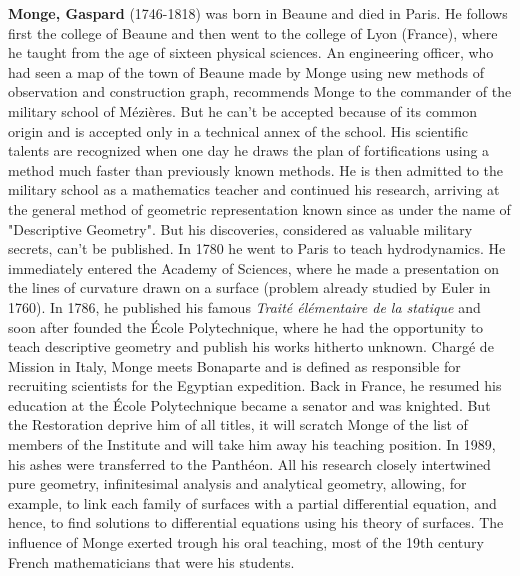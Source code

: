 \textbf{Monge, Gaspard} (1746-1818) was born in Beaune and died in Paris. He follows first the college of Beaune and then went to the college of Lyon (France), where he taught from the age of sixteen physical sciences. An engineering officer, who had seen a map of the town of Beaune made by Monge using new methods of observation and construction graph, recommends Monge to the commander of the military school of Mézières. But he can't be accepted because of its common origin and is accepted only in a technical annex of the school. His scientific talents are recognized when one day he draws the plan of fortifications using a method much faster than previously known methods. He is then admitted to the military school as a mathematics teacher and continued his research, arriving at the general method of geometric representation known since as under the name of "Descriptive Geometry". But his discoveries, considered as valuable military secrets, can't be published. In 1780 he went to Paris to teach hydrodynamics. He immediately entered the Academy of Sciences, where he made a presentation on the lines of curvature drawn on a surface (problem already studied by Euler in 1760). In 1786, he published his famous \textit{Traité élémentaire de la statique} and soon after founded the École Polytechnique, where he had the opportunity to teach descriptive geometry and publish his works hitherto unknown. Chargé de Mission in Italy, Monge meets Bonaparte and is defined as responsible for recruiting scientists for the Egyptian expedition. Back in France, he resumed his education at the École Polytechnique became a senator and was knighted. But the Restoration deprive him of all titles, it will scratch Monge of the list of members of the Institute and will take him away his teaching position. In 1989, his ashes were transferred to the Panthéon. All his research closely intertwined pure geometry, infinitesimal analysis and analytical geometry, allowing, for example, to link each family of surfaces with a partial differential equation, and hence, to find solutions to differential equations using his theory of surfaces. The influence of Monge exerted trough his oral teaching, most of the 19th century French mathematicians that were his students.

{}
\label{sec:N}

